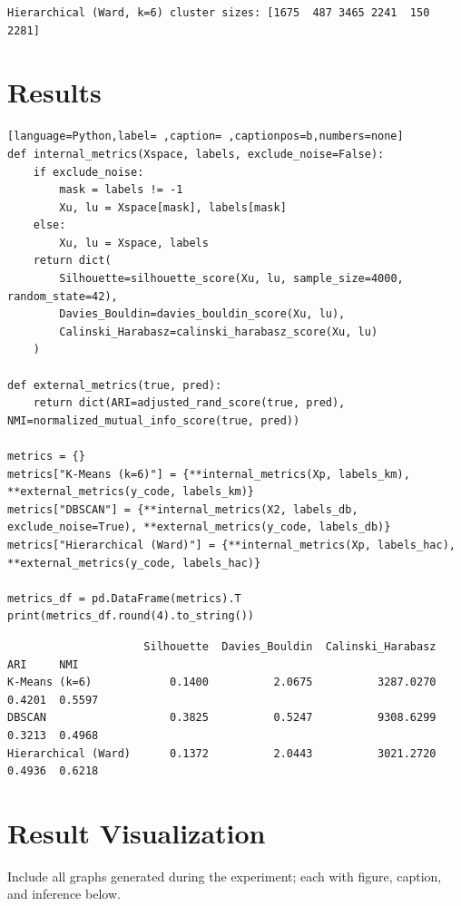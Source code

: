 \documentclass[12pt,a4paper]{article}
\begin{document}
\begin{verbatim}
Hierarchical (Ward, k=6) cluster sizes: [1675  487 3465 2241  150 2281]
\end{verbatim}

\section{Results}
\label{sec:org07bf468}

\begin{lstlisting}[language=Python,label= ,caption= ,captionpos=b,numbers=none]
def internal_metrics(Xspace, labels, exclude_noise=False):
    if exclude_noise:
        mask = labels != -1
        Xu, lu = Xspace[mask], labels[mask]
    else:
        Xu, lu = Xspace, labels
    return dict(
        Silhouette=silhouette_score(Xu, lu, sample_size=4000, random_state=42),
        Davies_Bouldin=davies_bouldin_score(Xu, lu),
        Calinski_Harabasz=calinski_harabasz_score(Xu, lu)
    )

def external_metrics(true, pred):
    return dict(ARI=adjusted_rand_score(true, pred), NMI=normalized_mutual_info_score(true, pred))

metrics = {}
metrics["K-Means (k=6)"] = {**internal_metrics(Xp, labels_km), **external_metrics(y_code, labels_km)}
metrics["DBSCAN"] = {**internal_metrics(X2, labels_db, exclude_noise=True), **external_metrics(y_code, labels_db)}
metrics["Hierarchical (Ward)"] = {**internal_metrics(Xp, labels_hac), **external_metrics(y_code, labels_hac)}

metrics_df = pd.DataFrame(metrics).T
print(metrics_df.round(4).to_string())
\end{lstlisting}

\begin{verbatim}
                     Silhouette  Davies_Bouldin  Calinski_Harabasz     ARI     NMI
K-Means (k=6)            0.1400          2.0675          3287.0270  0.4201  0.5597
DBSCAN                   0.3825          0.5247          9308.6299  0.3213  0.4968
Hierarchical (Ward)      0.1372          2.0443          3021.2720  0.4936  0.6218
\end{verbatim}

\section{Result Visualization}
\label{sec:org0680679}

Include all graphs generated during the experiment; each with figure,
caption, and inference below.
\end{document}
